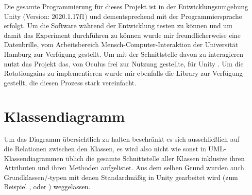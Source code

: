 Die gesamte Programmierung für dieses Projekt ist in der Entwicklungsumgebung Unity (Version: 2020.1.17f1) \cite{unity} und dementsprechend mit der Programmiersprache  erfolgt. Um die Software während der Entwicklung testen zu können und um damit das Experiment durchführen zu können wurde mir freundlicherweise eine  \cite{quest} Datenbrille, vom Arbeitsbereich Mensch-Computer-Interaktion der Universität Hamburg zur Verfügung gestellt. Um mit der Schnittstelle davon zu interagieren nutzt das Projekt das, von Oculus frei zur Nutzung gestellte,  für Unity \cite{integration}. Um die Rotationgains zu implementieren wurde mir ebenfalls die Library  zur Verfügung gestellt, die diesen Prozess stark vereinfacht.

\section{Klassendiagramm}
Um das Diagramm übersichtlich zu halten beschränkt es sich
ausschließlich auf die Relationen zwischen den Klassen, es wird also nicht wie sonst in UML-Klassendiagrammen üblich die gesamte Schnittstelle aller Klassen inklusive ihren Attributen und ihren Methoden aufgelistet.
Aus dem selben Grund wurden auch Grundklassen/-typen mit denen Standardmäßig in Unity gearbeitet wird (zum Beispiel ,  oder ) weggelassen.



